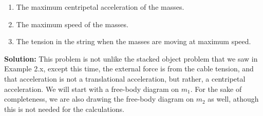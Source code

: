 \begin{example}
\begin{enumerate}[label=(\alph*),itemsep=4pt]
  \item The maximum centripetal acceleration of the masses.
  \item The maximum speed of the masses.
  \item The tension in the string when the masses are moving at maximum speed.
  \end{enumerate}
  \textbf{Solution:} This problem is not unlike the stacked object problem that
  we saw in Example 2.x, except this time, the external force is from the cable
  tension, and that acceleration is not a translational acceleration, but
  rather, a centripetal acceleration. We will start with a free-body diagram on
  $m_1$. For the sake of completeness, we are also drawing the free-body
  diagram on $m_2$ as well, athough this is not needed for the calculations.
  \begin{center}
    \hspace{.2in}
  \end{center}

\end{example}
